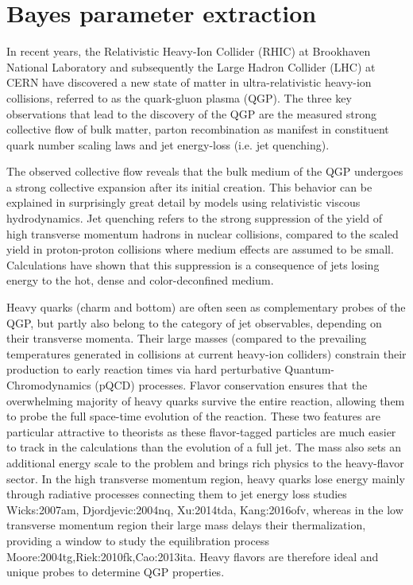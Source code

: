 \chapter{Bayes parameter extraction}

In recent years, the Relativistic Heavy-Ion Collider (RHIC) at Brookhaven National Laboratory and subsequently the Large Hadron Collider (LHC) at CERN have discovered a new state of matter in ultra-relativistic heavy-ion collisions, referred to as the quark-gluon plasma (QGP).
The three key observations that lead to 
the discovery of the QGP are the measured strong collective flow of bulk matter, parton recombination as manifest in constituent quark number scaling laws and jet energy-loss (i.e. jet quenching). 

The observed collective flow reveals that the bulk medium of the QGP undergoes a strong collective expansion after its initial creation.
This behavior can be explained in surprisingly great detail by models using relativistic viscous hydrodynamics.
Jet quenching refers to the strong suppression of the yield of high transverse momentum hadrons in nuclear collisions, compared to the scaled yield in proton-proton collisions where medium effects are assumed to be small.
Calculations have shown that this suppression is a consequence of jets losing energy to the hot, dense and color-deconfined medium. 

Heavy quarks (charm and bottom) are often seen as complementary probes of the QGP, but partly also belong to the category of jet observables, depending on their transverse momenta. Their large masses (compared to the prevailing temperatures generated in collisions at current heavy-ion colliders) constrain their production to early reaction times via hard perturbative Quantum-Chromodynamics (pQCD) processes. Flavor conservation ensures that the overwhelming majority of heavy quarks survive the entire reaction, allowing them to probe the full space-time evolution of the reaction.
These two features are particular attractive to theorists as these flavor-tagged particles are much easier to track in the calculations than the evolution of a full jet.
The mass also sets an additional energy scale to the problem and brings rich physics to the heavy-flavor sector.
In the high transverse momentum region, heavy quarks lose energy mainly through radiative processes connecting them to jet energy loss studies {Wicks:2007am, Djordjevic:2004nq, Xu:2014tda, Kang:2016ofv}, whereas
in the low transverse momentum region their large mass delays their thermalization, providing a window to study the equilibration process {Moore:2004tg,Riek:2010fk,Cao:2013ita}.
Heavy flavors are therefore ideal and unique probes to determine QGP properties.

